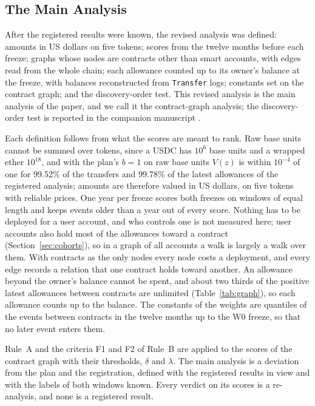 \documentclass{ieeeaccess}
\begin{document}
\subsection{The Main Analysis}
\label{sec:main}
After the registered results were known, the revised analysis was defined: amounts in US dollars on five tokens; scores from the twelve months before each freeze; graphs whose nodes are contracts other than smart accounts, with edges read from the whole chain; each allowance counted up to its owner's balance at the freeze, with balances reconstructed from \texttt{Transfer} logs; constants set on the contract graph; and the discovery-order test. This revised analysis is the main analysis of the paper, and we call it the contract-graph analysis; the discovery-order test is reported in the companion manuscript \cite{kwon2026companion}.

Each definition follows from what the scores are meant to rank. Raw base units cannot be summed over tokens, since a USDC has $10^{6}$ base units and a wrapped ether $10^{18}$, and with the plan's $b=1$ on raw base units $V(z)$ is within $10^{-4}$ of one for 99.52\% of the transfers and 99.78\% of the latest allowances of the registered analysis; amounts are therefore valued in US dollars, on five tokens with reliable prices. One year per freeze scores both freezes on windows of equal length and keeps events older than a year out of every score. Nothing has to be deployed for a user account, and who controls one is not measured here; user accounts also hold most of the allowances toward a contract (Section~\ref{sec:cohorts}), so in a graph of all accounts a walk is largely a walk over them. With contracts as the only nodes every node costs a deployment, and every edge records a relation that one contract holds toward another. An allowance beyond the owner's balance cannot be spent, and about two thirds of the positive latest allowances between contracts are unlimited (Table~\ref{tab:graph}), so each allowance counts up to the balance. The constants of the weights are quantiles of the events between contracts in the twelve months up to the W0 freeze, so that no later event enters them.

Rule~A and the criteria F1 and F2 of Rule~B are applied to the scores of the contract graph with their thresholds, $\delta$ and $\lambda$. The main analysis is a deviation from the plan and the registration, defined with the registered results in view and with the labels of both windows known. Every verdict on its scores is a re-analysis, and none is a registered result.
\end{document}
